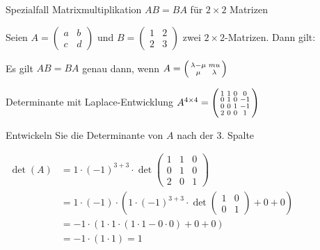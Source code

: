 \begin{example2}{Spezialfall Matrixmultiplikation} $AB = BA$ für $2\times 2$ Matrizen
    
        Seien $A=\left(\begin{array}{cc}a & b \\ c & d\end{array}\right)$ und $B=\left(\begin{array}{cc}1 & 2 \\ 2 & 3\end{array}\right)$ zwei $2 \times 2$-Matrizen. Dann gilt:
    
        Es gilt $AB = BA$ genau dann, wenn $A = \begin{psmallmatrix}
            \lambda-\mu & mu \\ \mu & \lambda
        \end{psmallmatrix}$
\end{example2}

\begin{example2}{Determinante} mit Laplace-Entwicklung
    $A^{4 \times 4} = \begin{psmallmatrix}
        1 & 1 & 0 & 0 \\
        0 & 1 & 0 & -1 \\
        0 & 0 & 1 & -1 \\
        2 & 0 & 0 & 1
    \end{psmallmatrix}$

    Entwickeln Sie die Determinante von $A$ nach der 3. Spalte

    $
    \begin{aligned}
    \operatorname{det}(A) & =1 \cdot(-1)^{3+3} \cdot \operatorname{det}\left(\begin{array}{ccc}1 & 1 & 0 \\ 0 & 1 & 0 \\ 2 & 0 & 1\end{array}\right) \\
    & =1 \cdot(-1) \cdot\left(1 \cdot(-1)^{3+3} \cdot \operatorname{det}\left(\begin{array}{cc}1 & 0 \\ 0 & 1\end{array}\right)+0+0\right) \\
    & =-1 \cdot\left(1 \cdot 1 \cdot(1 \cdot 1-0 \cdot 0)+0+0\right) \\
    & =-1 \cdot(1 \cdot 1)=1
    \end{aligned}
    $
\end{example2}

